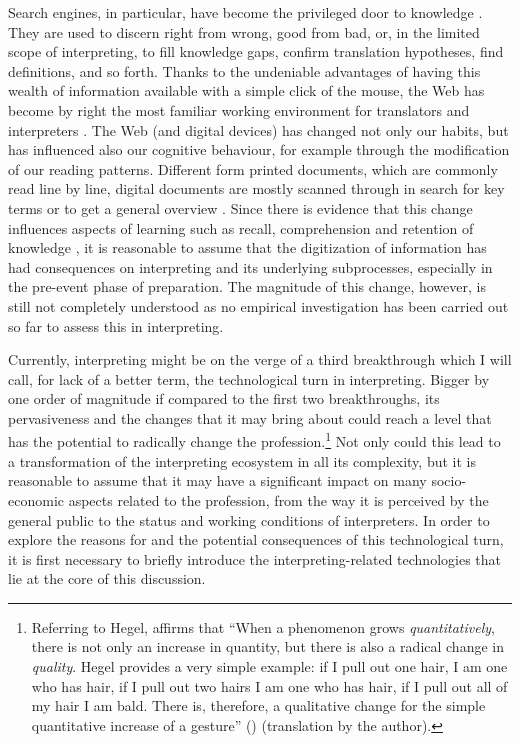 \documentclass[output=paper]{langsci/langscibook}
\begin{document}
Search engines, in particular, have become the privileged door to knowledge \citep{finn_what_2017}. They are used to discern right from wrong, good from bad, or, in the limited scope of interpreting, to fill knowledge gaps, confirm translation hypotheses, find definitions, and so forth. Thanks to the undeniable advantages of having this wealth of information available with a simple click of the mouse, the Web has become by right the most familiar working environment for translators and interpreters \citep{zanettin_corpora_2002}. The Web (and digital devices) has changed not only our habits, but has influenced also our cognitive behaviour, for example through the modification of our reading patterns. Different form printed documents, which are commonly read line by line, digital documents are mostly scanned through in search for key terms or to get a general overview \citep{pernice_f-shaped_2017}. Since there is evidence that this change influences aspects of learning such as recall, comprehension and retention of knowledge \citep{ross_print_2017}, it is reasonable to assume that the digitization of information has had consequences on interpreting and its underlying subprocesses, especially in the pre-event phase of preparation. The magnitude of this change, however, is still not completely understood as no empirical  investigation has been  carried out so far to assess this in interpreting.%
 
Currently, interpreting might be on the verge of a third breakthrough which I will call, for lack of a better term, the technological turn in interpreting. Bigger by one order of magnitude if compared to the first two breakthroughs, its pervasiveness and the changes that it may bring about could reach a level that has the potential to radically change the profession.\footnote{Referring to Hegel, \citeauthor{galimberti_i_2009} affirms that ``When a phenomenon grows \textit{quantitatively}, there is not only an increase in quantity, but there is also a radical change in \textit{quality}. Hegel provides a very simple example: if I pull out one hair, I am one who has hair, if I pull out two hairs I am one who has hair, if I pull out all of my hair I am bald. There is, therefore, a qualitative change for the simple quantitative increase of a gesture'' (\citeyear[215]{galimberti_i_2009}) (translation by the author).} Not only could this lead to a transformation of the interpreting ecosystem in all its complexity, but it is reasonable to assume that it may have a significant impact on many socio- economic aspects related to the profession, from the way it is perceived by the general public to the status and working conditions of interpreters. In order to explore the reasons for and the potential consequences of this technological turn, it is first necessary to briefly introduce the interpreting-related technologies that lie at the core of this discussion. 
 
\end{document}
